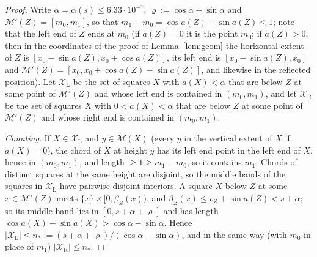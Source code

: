 \documentclass[11pt]{amsart}
\theoremstyle{definition}
\theoremstyle{remark}
\begin{document}
\begin{proof}
Write $\alpha=\alpha(s)\le6.33\cdot10^{-7}$, $\varrho:=\cos\alpha+\sin\alpha$ and $\mathcal M'(Z)=[m_0,m_1]$, so that
$m_1-m_0=\cos a(Z)-\sin a(Z)\le1$; note that the left end of $Z$ ends at $m_0$ (if $a(Z)=0$ it is the point $m_0$; if $a(Z)>0$,
then in the coordinates of the proof of Lemma~\ref{lem:geom} the horizontal extent of $Z$ is $[x_0-\sin a(Z),x_0+\cos a(Z)]$, its left end
is $[x_0-\sin a(Z),x_0]$ and $\mathcal M'(Z)=[x_0,x_0+\cos a(Z)-\sin a(Z)]$, and likewise in the reflected position). Let $\mathcal X_{\mathrm L}$ be the set of squares $X$ with
$a(X)<\alpha$ that are below $Z$ at some point of $\mathcal M'(Z)$ and whose left end is contained in $(m_0,m_1)$, and let
$\mathcal X_{\mathrm R}$ be the set of squares $X$ with $0<a(X)<\alpha$ that are below $Z$ at some point of $\mathcal M'(Z)$ and whose right end
is contained in $(m_0,m_1)$.

\emph{Counting.} If $X\in\mathcal X_{\mathrm L}$ and $y\in\mathcal M(X)$ \textup{(}every $y$ in the vertical extent of $X$ if $a(X)=0$\textup{)}, the
chord of $X$ at height $y$ has its left end point in the left end of $X$, hence in $(m_0,m_1)$, and length $\ge1\ge m_1-m_0$, so it
contains $m_1$. Chords of distinct squares at the same height are disjoint, so the middle bands of the squares in $\mathcal X_{\mathrm L}$
have pairwise disjoint interiors. A square $X$ below $Z$ at some $x\in\mathcal M'(Z)$ meets $\{x\}\times[0,\beta_Z(x))$, and
$\beta_Z(x)\le v_Z+\sin a(Z)<s+\alpha$; so its middle band lies in $[0,s+\alpha+\varrho]$ and has length $\cos a(X)-\sin a(X)>
\cos\alpha-\sin\alpha$. Hence $|\mathcal X_{\mathrm L}|\le n_*:=(s+\alpha+\varrho)/(\cos\alpha-\sin\alpha)$, and in the same way (with $m_0$ in
place of $m_1$) $|\mathcal X_{\mathrm R}|\le n_*$.


\end{proof}
\end{document}
